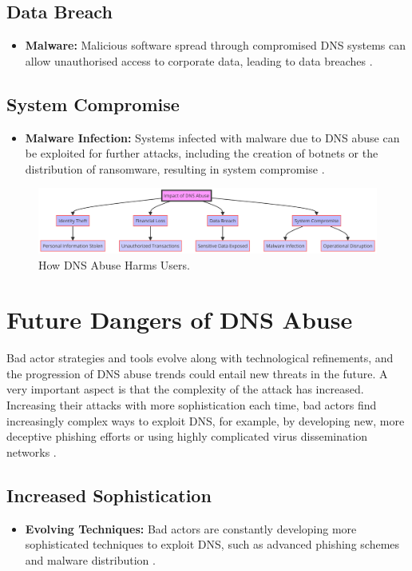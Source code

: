 \subsection{Data Breach}
\begin{itemize}
    \item \textbf{Malware:} Malicious software spread through compromised DNS systems can allow unauthorised access to corporate data, leading to data breaches \cite{fowler2016data}.
\end{itemize}

\subsection{System Compromise}
\begin{itemize}
    \item \textbf{Malware Infection:} Systems infected with malware due to DNS abuse can be exploited for further attacks, including the creation of botnets or the distribution of ransomware, resulting in system compromise \cite{saxe2018malware}.
\end{itemize}
\captionsetup{font= footnotesize}
\begin{figure}[H]
\centering
\includegraphics[width=\textwidth]{background/DNSabuseHarm.png}
\caption{How DNS Abuse Harms Users.}
\label{fig:figureFour}
\end{figure}


\section{Future Dangers of DNS Abuse}

Bad actor strategies and tools evolve along with technological refinements, and the progression of DNS abuse trends could entail new threats in the future. A very important aspect is that the complexity of the attack has increased. Increasing their attacks with more sophistication each time, bad actors find increasingly complex ways to exploit DNS, for example, by developing new, more deceptive phishing efforts or using highly complicated virus dissemination networks \cite{icann2022dnsabusetrends}.

\subsection{Increased Sophistication}
\begin{itemize}
    \item \textbf{Evolving Techniques:} Bad actors are constantly developing more sophisticated techniques to exploit DNS, such as advanced phishing schemes and malware distribution \cite{wrightson2014advanced}.
\end{itemize}

